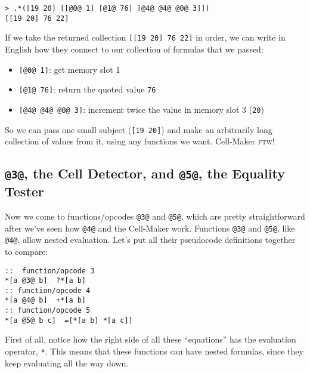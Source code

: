 \documentclass[twoside]{article}
\begin{document}
\begin{lstlisting}[style=listingcode]
> .*([19 20] [[@0@ 1] [@1@ 76] [@4@ @4@ @0@ 3]])
[[19 20] 76 22]
\end{lstlisting}

If we take the returned collection \lstinline[style=inlinecode]{[[19 20] 76 22]} in order, we can write in English how they connect to our collection of formulas that we passed:

\begin{itemize}
  \item  \lstinline[style=inlinecode]{[@0@ 1]}: get memory slot 1
  \item  \lstinline[style=inlinecode]{[@1@ 76]}: return the quoted value \lstinline[style=inlinecode]{76}
  \item  \lstinline[style=inlinecode]{[@4@ @4@ @0@ 3]}: increment twice the value in memory slot 3 (\lstinline[style=inlinecode]{20})
\end{itemize}

So we can pass one small subject (\lstinline[style=inlinecode]{[19 20]}) and make an arbitrarily long collection of values from it, using any functions we want. Cell-Maker \textsc{ftw}!

\subsection{\lstinline[style=inlinecode]{@3@}, the Cell Detector, and \lstinline[style=inlinecode]{@5@}, the Equality Tester}

Now we come to functions/opcodes \lstinline[style=inlinecode]{@3@} and \lstinline[style=inlinecode]{@5@}, which are pretty straightforward after we've seen how \lstinline[style=inlinecode]{@4@} and the Cell-Maker work. Functions \lstinline[style=inlinecode]{@3@} and \lstinline[style=inlinecode]{@5@}, like \lstinline[style=inlinecode]{@4@}, allow nested evaluation. Let's put all their pseudocode definitions together to compare:

\begin{lstlisting}[style=listingcode]
::  function/opcode 3
*[a @3@ b]  ?*[a b]
:: function/opcode 4
*[a @4@ b]  +*[a b]
:: function/opcode 5
*[a @5@ b c]  =[*[a b] *[a c]]
\end{lstlisting}

First of all, notice how the right side of all these “equations” has the evaluation operator, \lstinline[style=inlinecode]{*}. This means that these functions can have nested formulas, since they keep evaluating all the way down.
\end{document}
